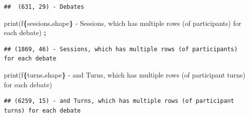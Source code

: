 \documentclass[
]{article}
\newenvironment{Shaded}{\begin{snugshade}}{\end{snugshade}}
\newcommand{\BuiltInTok}[1]{#1}
\newcommand{\NormalTok}[1]{#1}
\newcommand{\OperatorTok}[1]{\textcolor[rgb]{0.81,0.36,0.00}{\textbf{#1}}}
\newcommand{\SpecialCharTok}[1]{\textcolor[rgb]{0.81,0.36,0.00}{\textbf{#1}}}
\newcommand{\SpecialStringTok}[1]{\textcolor[rgb]{0.31,0.60,0.02}{#1}}
\begin{document}
\begin{verbatim}
##  (631, 29) - Debates
\end{verbatim}

\begin{Shaded}
\begin{Highlighting}[]
\BuiltInTok{print}\NormalTok{(}\SpecialStringTok{f\textquotesingle{}}\SpecialCharTok{\{}\NormalTok{sessions}\SpecialCharTok{.}\NormalTok{shape}\SpecialCharTok{\}}\SpecialStringTok{ {-} Sessions, which has multiple rows (of participants) for each debate\textquotesingle{}}\NormalTok{) }\OperatorTok{;}
\end{Highlighting}
\end{Shaded}

\begin{verbatim}
## (1869, 46) - Sessions, which has multiple rows (of participants) for each debate
\end{verbatim}

\begin{Shaded}
\begin{Highlighting}[]
\BuiltInTok{print}\NormalTok{(}\SpecialStringTok{f\textquotesingle{}}\SpecialCharTok{\{}\NormalTok{turns}\SpecialCharTok{.}\NormalTok{shape}\SpecialCharTok{\}}\SpecialStringTok{ {-} and Turns, which has multiple rows (of participant turns) for each debate\textquotesingle{}}\NormalTok{)}
\end{Highlighting}
\end{Shaded}

\begin{verbatim}
## (6259, 15) - and Turns, which has multiple rows (of participant turns) for each debate
\end{verbatim}
\end{document}
